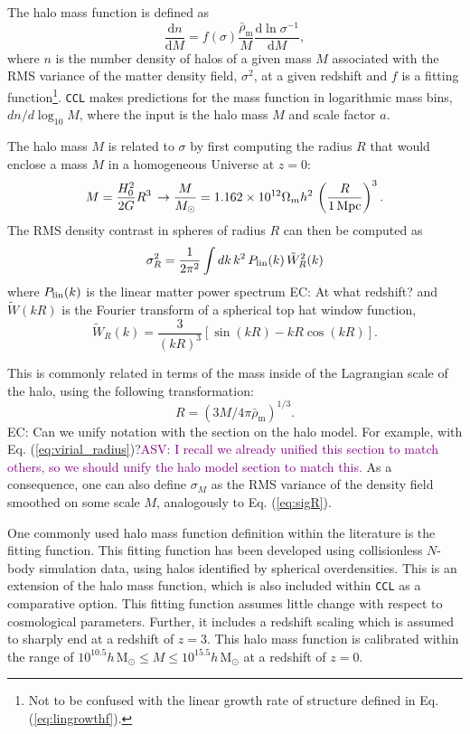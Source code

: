 \documentclass[\docopts]{\docclass}
\newcommand{\asv}[1]{\textcolor{purple}{ASV: #1}}
\newcommand{\elisa}[1]{\textcolor{green!10!orange!90!}{EC: #1}}
\newcommand{\ccl}{{\tt CCL}\xspace}
\begin{document}
The halo mass function is defined as
\begin{equation}
\frac{\mathrm{d}n}{\mathrm{d}M}=f(\sigma)\frac{\bar{\rho}_\mathrm{m}}{M}\frac{\mathrm{d}\ln{\sigma^{-1}}}{\mathrm{d}M},
\label{eq:halo_mass_function}
\end{equation}
where $n$ is the number density of halos of a given mass $M$ associated with the RMS variance of the matter density field, $\sigma^2$, at a given redshift and $f$ is a fitting function\footnote{Not to be confused with the linear growth rate of structure defined in Eq. (\ref{eq:lingrowthf}).}. \ccl makes predictions for the mass function in logarithmic mass bins, $dn/d\log_{10}{M}$, where the input is the halo mass $M$ and scale factor $a$.

The halo mass $M$ is related to $\sigma$ by first computing the radius $R$ that would enclose a mass $M$ in a homogeneous Universe at $z=0$:
\begin{equation}
  M=\frac{H_0^2}{2G}R^3\,\rightarrow \frac{M}{M_\odot}=1.162\times10^{12}\Omega_mh^2\,\left(\frac{R}{1\,{\rm Mpc}}\right)^3.
\end{equation}
The RMS density contrast in spheres of radius $R$ can then be computed as
\begin{equation}
  \sigma_R^2 = \frac{1}{2\pi^2}\int dk\,k^2\,P_{\rm lin}(k)\,\tilde{W}_R^2(k)
  \label{eq:sigR}
\end{equation}
where $P_{\rm lin}(k)$ is the linear matter power spectrum \elisa{At what redshift?} and $\tilde{W}(kR)$ is the Fourier transform of a spherical top hat window function,
\begin{equation}
\tilde{W}_R(k) = \frac{3}{(kR)^3}[\sin(kR)-kR\cos(kR)].
\end{equation}

This is commonly related in terms of the mass inside of the Lagrangian scale of the halo, using the following transformation:
\begin{equation}
R = (3M/4\pi{\bar\rho_{\mathrm{m}}})^{1/3}.
\label{eq:lagrangemass}
\end{equation}
\elisa{Can we unify notation with the section on the halo model. For example, with Eq. (\ref{eq:virial_radius})?}\asv{I recall we already unified this section to match others, so we should unify the halo model section to match this.}
As a consequence, one can also define $\sigma_M$ as the RMS variance of the density field smoothed on some scale $M$, analogously to Eq. (\ref{eq:sigR}).

One commonly used halo mass function definition within the literature is the \citet{Tinker2010} fitting function. This fitting function has been developed using collisionless $N$-body simulation data, using halos identified by spherical overdensities. This is an extension of the \citet{Tinker2008} halo mass function, which is also included within \ccl as a comparative option. This fitting function assumes little change with respect to cosmological parameters. Further, it includes a redshift scaling which is assumed to sharply end at a redshift of $z = 3$. This halo mass function is calibrated within the range of $10^{10.5} h\,\mathrm{M}_\odot \leq M \leq 10^{15.5} h\,\mathrm{M}_\odot$ at a redshift of $z = 0$.
\end{document}
